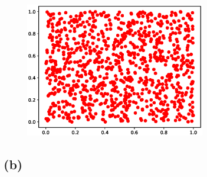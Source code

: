 \documentclass[12pt]{article}
\begin{document}
\begin{figure}[h]
    \centering
    \includegraphics[width=0.7\textwidth]{figures/randu.eps}
\end{figure}

\newpage

\subsection*{(b)}
\end{document}
